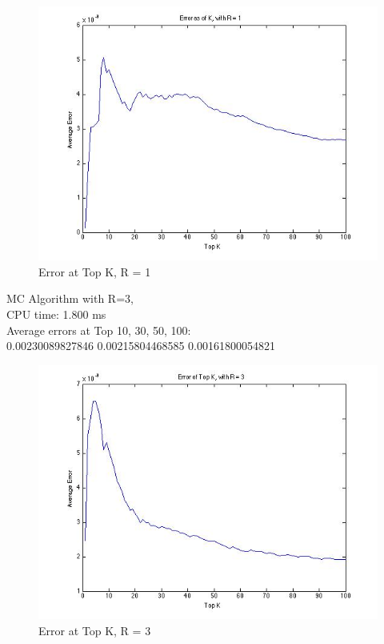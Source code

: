 \documentclass{article}
\begin{document}
\begin{figure}[H]
\centering
\includegraphics[scale=0.5]{q2-ErrorTopK-R1.jpg}
\caption{ Error at Top K, R = 1}
\label{}
\end{figure}

MC Algorithm with R=3, \\
\indent CPU time: 1.800 ms\\
\indent Average errors at Top 10, 30, 50, 100:\\
0.00230089827846
0.00215804468585
0.00161800054821 \\

\begin{figure}[H]
\centering
\includegraphics[scale=0.5]{q2-ErrorTopK-R3.jpg}
\caption{ Error at Top K, R = 3}
\label{}
\end{figure}
\end{document}
